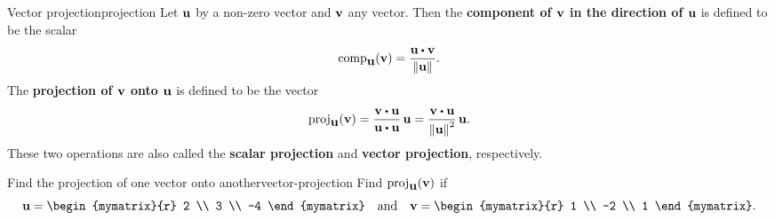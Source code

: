 \begin{definition}{Vector projection}{projection}
  Let $\mbox{\bf u}$ by a non-zero vector and $\mbox{\bf v}$ any vector. Then
  the \textbf{component of $\mbox{\bf v}$ in the direction of
    $\mbox{\bf u}$} is defined to be the scalar
  \begin{equation*}
    \comp_{\vect{u}}(\vect{v})
    = \frac{\vect{u}\dotprod \vect{v}}{\norm{\vect{u}}}.
  \end{equation*}
  The \textbf{projection of $\mbox{\bf v}$ onto
    $\mbox{\bf u}$} is defined to be the vector
  \begin{equation*}
    \proj_{\vect{u}}(\vect{v}) = 
      \frac{\vect{v}\dotprod \vect{u}}{\vect{u}\dotprod \vect{u}}\, \vect{u}
    =
    \frac{\vect{v}\dotprod \vect{u}}{\norm{\vect{u}} ^{2}}\,\vect{u}.
  \end{equation*}
  These two operations are also called the \textbf{scalar
    projection}
  and \textbf{vector projection}, respectively.
\end{definition}

\begin{example}{Find the projection of one vector onto another}{vector-projection}
  Find $\proj_{\vect{u}}(\vect{v})$ if
  \begin{equation*}
    \vect{u}=
    \begin{mymatrix}{r}
      2 \\
      3 \\
      -4
    \end{mymatrix}
    \quad\mbox{and}\quad
    \vect{v}=
    \begin{mymatrix}{r}
      1 \\
      -2 \\
      1
    \end{mymatrix}.
  \end{equation*}
\end{example}

